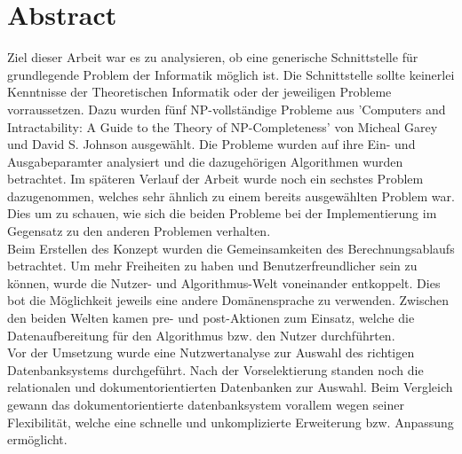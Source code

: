 %
%

\thispagestyle{empty}


\newpage
\thispagestyle{empty}
\chapter*{Abstract}\label{abstract}
Ziel dieser Arbeit war es zu analysieren, ob eine generische Schnittstelle für grundlegende Problem der Informatik möglich ist. Die Schnittstelle sollte keinerlei Kenntnisse 
der Theoretischen Informatik oder der jeweiligen Probleme vorraussetzen. Dazu wurden fünf NP-vollständige Probleme aus 'Computers and Intractability: A Guide to the Theory of 
NP-Completeness' von Micheal Garey und David S. Johnson ausgewählt.  Die Probleme wurden auf ihre Ein- und Ausgabeparamter analysiert und die dazugehörigen 
Algorithmen wurden betrachtet. Im späteren Verlauf der Arbeit wurde noch ein sechstes Problem dazugenommen, welches sehr ähnlich zu einem bereits ausgewählten Problem war. Dies 
um zu schauen, wie sich die beiden Probleme bei der Implementierung im Gegensatz zu den anderen Problemen verhalten.\\

Beim Erstellen des Konzept wurden die Gemeinsamkeiten des Berechnungsablaufs betrachtet. Um mehr Freiheiten zu haben und Benutzerfreundlicher sein zu können, wurde die Nutzer- und 
Algorithmus-Welt voneinander entkoppelt. Dies bot die Möglichkeit jeweils eine andere Domänensprache zu verwenden. Zwischen den beiden Welten kamen pre- und post-Aktionen zum Einsatz, 
welche die Datenaufbereitung für den Algorithmus bzw. den Nutzer durchführten.\\

Vor der Umsetzung wurde eine Nutzwertanalyse zur Auswahl des richtigen Datenbanksystems durchgeführt. Nach der Vorselektierung standen noch die relationalen und dokumentorientierten 
Datenbanken zur Auswahl. Beim Vergleich gewann das dokumentorientierte datenbanksystem vorallem wegen seiner Flexibilität, welche eine schnelle und unkomplizierte Erweiterung bzw. Anpassung 
ermöglicht.\\

